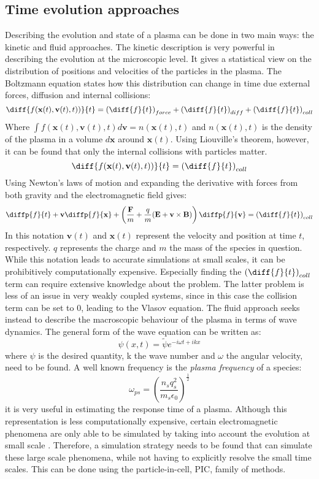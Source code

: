 \subsection{Time evolution approaches}
\label{subsec:plasma approaches}
Describing the evolution and state of a plasma can be done in two main ways: the kinetic and fluid approaches. The kinetic description is very powerful in describing the evolution at the microscopic level. It gives a statistical view on the distribution of positions and velocities of the particles in the plasma. The Boltzmann equation states how this distribution can change in time due external forces, diffusion and internal collisions:
\[\diff{f(\textbf{x}(t), \textbf{v}(t),t))}{t} =\left(\diff{f}{t}\right)_{force}+\left(\diff{f}{t}\right)_{diff}+ \left(\diff{f}{t}\right)_{coll}\]
Where $\int f(\textbf{x}(t),\textbf{v}(t),t)d\textbf{v} = n(\textbf{x}(t),t)$ and $n(\textbf{x}(t),t)$ is the density of the plasma in a volume $d\textbf{x}$ around $\textbf{x}(t)$. Using Liouville's theorem, however, it can be found that only the internal collisions with particles matter.\[\diff{f(\textbf{x}(t), \textbf{v}(t),t))}{t} = \left(\diff{f}{t}\right)_{coll}\]
Using Newton's laws of motion and expanding the derivative with forces from both gravity and the electromagnetic field gives:
\[\diffp{f}{t} + \textbf{v} \diffp{f}{{\textbf{x}}} + \left( \frac{\textbf{F}}{m} + \frac{q}{m}(\textbf{E} + \textbf{v} \times \textbf{B})\right)\diffp{f}{{\textbf{v}}}= \left(\diff{f}{t}\right)_{coll}\]
In this notation $\textbf{v}(t)$ and $\textbf{x}(t)$ represent the velocity and position at time $t$, respectively. $q$ represents the charge and $m$ the mass of the species in question.
While this notation leads to accurate simulations at small scales, it can be prohibitively computationally expensive. Especially finding the $\left(\diff{f}{t}\right)_{coll}$ term can require extensive knowledge about the problem. The latter problem is less of an issue in very weakly coupled systems, since in this case the collision term can be set to 0, leading to the Vlasov equation.
\newline
The fluid approach seeks instead to describe the macroscopic behaviour of the plasma in terms of wave dynamics. The general form of the wave equation can be written as: \[\psi(x,t) = \tilde{\psi}e^{-i\omega t + i k x}\] where $\psi$ is the desired quantity, k the wave number and $\omega$ the angular velocity, need to be found. A well known frequency is the \textit{plasma frequency} of a species:
\[\omega_{ps} = \left(\frac{n_s q_s^2}{m_s\epsilon_0}\right)^{\frac{1}{2}}\]
it is very useful in estimating the response time of a plasma.
\newline
Although this representation is less computationally expensive, certain electromagnetic phenomena are only able to be simulated by taking into account the evolution at small scale \cite{biskamp_magnetic_2000}. Therefore, a simulation strategy needs to be found that can simulate these large scale phenomena, while not having to explicitly resolve the small time scales. This can be done using the particle-in-cell, PIC, family of methods. \cite{giovanni_lapenta_introduction_nodate}
